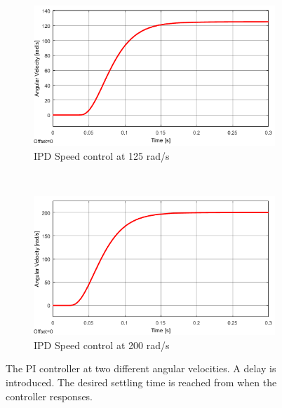\begin{figure}[h!]
	\centering
	\begin{subfigure}[b]{0.45\textwidth}
		\includegraphics[width=\textwidth]{graphics/IPD_single125}
		\caption{IPD Speed control at 125 rad/s}
		\label{fig:ipdsingle125}
	\end{subfigure}
	~ %
	\begin{subfigure}[b]{0.45\textwidth}
		\includegraphics[width=\textwidth]{graphics/IPD_single200}
		\caption{IPD Speed control at 200 rad/s}
		\label{fig:ipdsingle200}
	\end{subfigure}
	\caption{The PI controller at two different angular velocities. A delay is introduced. The desired settling time is reached from when the controller responses.}\label{fig:ipdsingle}
\end{figure}

